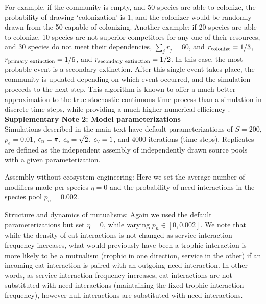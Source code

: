 \documentclass[onecolumn,preprintnumbers,amsmath,amssymb,superscriptaddress]{revtex4-1}
\newcommand{\rr}[1]{{\rm #1}}
\begin{document}
\begin{bibunit}
For example, if the community is empty, and 50 species are able to colonize, the probability of drawing `colonization' is 1, and the colonizer would be randomly drawn from the 50 capable of colonizing.
Another example: if 20 species are able to colonize, 10 species are not superior competitors for any one of their resources, and 30 species do not meet their dependencies, $\sum_j{r_j} = 60$, and $r_\rr{colonize} = 1/3$, $r_\rr{primary~extinction} = 1/6$, and $r_\rr{secondary~extinction} = 1/2$.
In this case, the most probable event is a secondary extinction.
After this single event takes place, the community is updated depending on which event occurred, and the simulation proceeds to the next step.
This algorithm is known to offer a much better approximation to the true stochastic continuous time process than a simulation in discrete time steps, while providing a much higher numerical efficiency \cite{Gillespie1977}.\\


\noindent \textbf{Supplementary Note 2: Model parameterizations}\\
Simulations described in the main text have default parameterizations of $S=200$, $p_e=0.01$, $c_{\rm n} = \pi$, $c_{\rm e} = \sqrt{2}$, $c_{\rm v} = 1$, and $4000$ iterations (time-steps).
Replicates are defined as the independent assembly of independently drawn source pools with a given parameterization.

Assembly without ecosystem engineering: Here we set the average number of modifiers made per species $\eta = 0$ and the probability of need interactions in the species pool $p_n=0.002$.

Structure and dynamics of mutualisms: Again we used the default parameterizations but set $\eta = 0$, while varying $p_n \in [0,0.002]$.
We note that while the density of eat interactions is not changed as service interaction frequency increases, what would previously have been a trophic interaction is more likely to be a mutualism (trophic in one direction, service in the other) if an incoming eat interaction is paired with an outgoing need interaction. 
In other words, as service interaction frequency increases, eat interactions are not substituted with need interactions (maintaining the fixed trophic interaction frequency), however null interactions are substituted with need interactions.


\end{bibunit}
\end{document}
